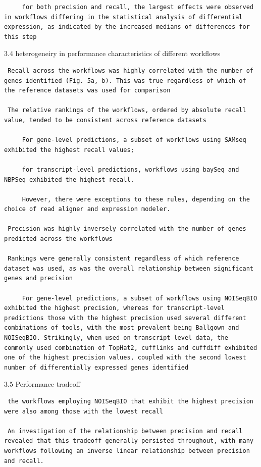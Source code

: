 \documentclass[
]{book}
\begin{document}
\begin{enumerate}
\begin{verbatim}
     for both precision and recall, the largest effects were observed in workflows differing in the statistical analysis of differential expression, as indicated by the increased medians of differences for this step
\end{verbatim}

  3.4 heterogeneiry in performance characteristics of different workflows

\begin{verbatim}
 Recall across the workflows was highly correlated with the number of genes identified (Fig. 5a, b). This was true regardless of which of the reference datasets was used for comparison

 The relative rankings of the workflows, ordered by absolute recall value, tended to be consistent across reference datasets

     For gene-level predictions, a subset of workflows using SAMseq exhibited the highest recall values;

     for transcript-level predictions, workflows using baySeq and NBPSeq exhibited the highest recall.

     However, there were exceptions to these rules, depending on the choice of read aligner and expression modeler.

 Precision was highly inversely correlated with the number of genes predicted across the workflows

 Rankings were generally consistent regardless of which reference dataset was used, as was the overall relationship between significant genes and precision

     For gene-level predictions, a subset of workflows using NOISeqBIO exhibited the highest precision, whereas for transcript-level predictions those with the highest precision used several different combinations of tools, with the most prevalent being Ballgown and NOISeqBIO. Strikingly, when used on transcript-level data, the commonly used combination of TopHat2, cufflinks and cuffdiff exhibited one of the highest precision values, coupled with the second lowest number of differentially expressed genes identified
\end{verbatim}

  3.5 Performance tradeoff

\begin{verbatim}
 the workflows employing NOISeqBIO that exhibit the highest precision were also among those with the lowest recall

 An investigation of the relationship between precision and recall revealed that this tradeoff generally persisted throughout, with many workflows following an inverse linear relationship between precision and recall.


\end{verbatim}
\end{enumerate}
\end{document}
